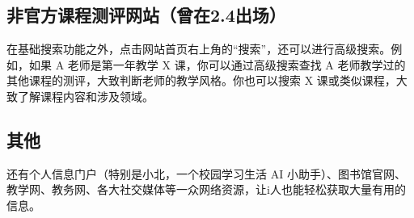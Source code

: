 \vspace{10pt}

\subsection{非官方课程测评网站（曾在2.4出场）}

\vspace{10pt}

在基础搜索功能之外，点击网站首页右上角的“搜索”，还可以进行高级搜索。例如，如果 A 老师是第一年教学 X 课，你可以通过高级搜索查找 A 老师教学过的其他课程的测评，大致判断老师的教学风格。你也可以搜索 X 课或类似课程，大致了解课程内容和涉及领域。

\vspace{10pt}

\subsection{其他}

\vspace{10pt}

还有个人信息门户（特别是小北，一个校园学习生活 AI 小助手）、图书馆官网、教学网、教务网、各大社交媒体等一众网络资源，让i人也能轻松获取大量有用的信息。
